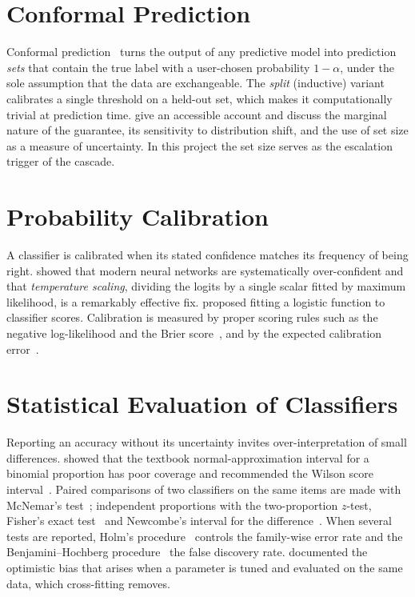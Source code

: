 \section{Conformal Prediction}

Conformal prediction~\citep{vovk2005algorithmic} turns the output of any predictive model into prediction \emph{sets} that contain the true label with a user-chosen probability $1-\alpha$, under the sole assumption that the data are exchangeable. The \emph{split} (inductive) variant calibrates a single threshold on a held-out set, which makes it computationally trivial at prediction time. \citet{angelopoulos2021gentle} give an accessible account and discuss the marginal nature of the guarantee, its sensitivity to distribution shift, and the use of set size as a measure of uncertainty. In this project the set size serves as the escalation trigger of the cascade.

\section{Probability Calibration}

A classifier is calibrated when its stated confidence matches its frequency of being right. \citet{guo2017calibration} showed that modern neural networks are systematically over-confident and that \emph{temperature scaling}, dividing the logits by a single scalar fitted by maximum likelihood, is a remarkably effective fix. \citet{platt1999probabilistic} proposed fitting a logistic function to classifier scores. Calibration is measured by proper scoring rules such as the negative log-likelihood and the Brier score~\citep{brier1950verification}, and by the expected calibration error~\citep{naeini2015obtaining}.

\section{Statistical Evaluation of Classifiers}

Reporting an accuracy without its uncertainty invites over-interpretation of small differences. \citet{brown2001interval} showed that the textbook normal-approximation interval for a binomial proportion has poor coverage and recommended the Wilson score interval~\citep{wilson1927probable}. Paired comparisons of two classifiers on the same items are made with McNemar's test~\citep{mcnemar1947note}; independent proportions with the two-proportion $z$-test, Fisher's exact test~\citep{fisher1922interpretation} and Newcombe's interval for the difference~\citep{newcombe1998interval}. When several tests are reported, Holm's procedure~\citep{holm1979simple} controls the family-wise error rate and the Benjamini--Hochberg procedure~\citep{benjamini1995controlling} the false discovery rate. \citet{varma2006bias} documented the optimistic bias that arises when a parameter is tuned and evaluated on the same data, which cross-fitting removes.

